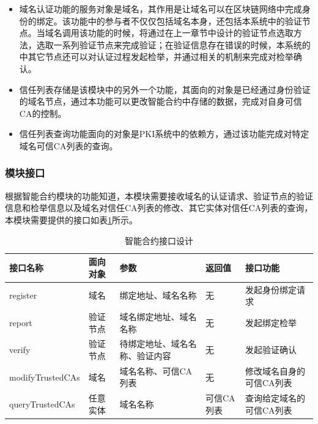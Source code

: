 \begin{itemize}
	\item 
	\noindent{}

	域名认证功能的服务对象是域名，其作用是让域名可以在区块链网络中完成身份的绑定。该功能中的参与者不仅仅包括域名本身，还包括本系统中的验证节点。当域名调用该功能的时候，将通过在上一章节中设计的验证节点选取方法，选取一系列验证节点来完成验证；在验证信息存在错误的时候，本系统的中其它节点还可以对认证过程发起检举，并通过相关的机制来完成对检举确认。

	\item 
	\noindent{}

	信任列表存储是该模块中的另外一个功能，其面向的对象是已经通过身份验证的域名节点，通过本功能可以更改智能合约中存储的数据，完成对自身可信CA的控制。

	\item
	\noindent{}

	信任列表查询功能面向的对象是PKI系统中的依赖方，通过该功能完成对特定域名可信CA列表的查询。

\end{itemize}


\subsubsection{模块接口}

根据智能合约模块的功能知道，本模块需要接收域名的认证请求、验证节点的验证信息和检举信息以及域名对信任CA列表的修改、其它实体对信任CA列表的查询，本模块需要提供的接口如表\ref{table:smartContractInterface}所示。

\begin{table}[h] %
\centering
\begin{tabular}{p{3.2cm}|p{2cm}|p{2.5cm}|p{2cm}|p{4cm}} %
\hline  
 接口名称 & 面向对象 & 参数 & 返回值 & 接口功能\\ %
\hline
register & 域名 & 绑定地址、域名名称 & 无 & 发起身份绑定请求 \\
\hline 
report & 验证节点 & 域名绑定地址、域名名称 & 无 & 发起绑定检举 \\
\hline 
verify & 验证节点 & 待绑定地址、域名名称、验证内容 & 无 & 发起验证确认 \\
\hline 
modifyTrustedCAs & 域名 & 域名名称、可信CA列表 & 无 & 修改域名自身的可信CA列表 \\
\hline 
queryTrustedCAs & 任意实体 & 域名名称 & 可信CA列表 & 查询给定域名的可信CA列表 \\
\hline 
\end{tabular}  
\caption{智能合约接口设计}\label{table:smartContractInterface} %
\end{table} 

